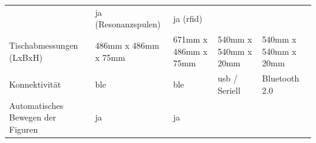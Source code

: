 \begin{longtable}[]{@{}lllll@{}}
\begin{minipage}[t]{0.22\columnwidth}
\end{minipage} & \begin{minipage}[t]{0.15\columnwidth}\raggedright
ja (Resonanzspulen)\strut
\end{minipage} & \begin{minipage}[t]{0.13\columnwidth}\raggedright
ja (\gls{rfid})\strut
\end{minipage}\tabularnewline
\begin{minipage}[t]{0.18\columnwidth}\raggedright
Tischabmessungen (LxBxH)\strut
\end{minipage} & \begin{minipage}[t]{0.18\columnwidth}\raggedright
486mm x 486mm x 75mm\strut
\end{minipage} & \begin{minipage}[t]{0.22\columnwidth}\raggedright
671mm x 486mm x 75mm\strut
\end{minipage} & \begin{minipage}[t]{0.15\columnwidth}\raggedright
540mm x 540mm x 20mm\strut
\end{minipage} & \begin{minipage}[t]{0.13\columnwidth}\raggedright
540mm x 540mm x 20mm\strut
\end{minipage}\tabularnewline
\begin{minipage}[t]{0.18\columnwidth}\raggedright
Konnektivität\strut
\end{minipage} & \begin{minipage}[t]{0.18\columnwidth}\raggedright
\gls{ble}\strut
\end{minipage} & \begin{minipage}[t]{0.22\columnwidth}\raggedright
\gls{ble}\strut
\end{minipage} & \begin{minipage}[t]{0.15\columnwidth}\raggedright
\gls{usb} / Seriell\strut
\end{minipage} & \begin{minipage}[t]{0.13\columnwidth}\raggedright
Bluetooth 2.0\strut
\end{minipage}\tabularnewline
\begin{minipage}[t]{0.18\columnwidth}\raggedright
Automatisches Bewegen der Figuren\strut
\end{minipage} & \begin{minipage}[t]{0.18\columnwidth}\raggedright
ja\strut
\end{minipage} & \begin{minipage}[t]{0.22\columnwidth}\raggedright
ja\strut
\end{minipage} & \begin{minipage}[t]{0.15\columnwidth}\raggedright

\end{minipage}
\end{longtable}
